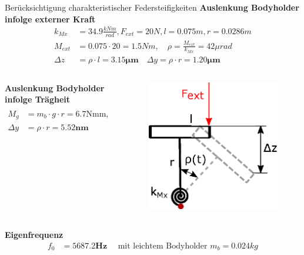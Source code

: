 \documentclass[10pt,xcolor=dvipsnames]{beamer}
\begin{document}
		\begin{frame}{\small Berücksichtigung charakteristischer Federsteifigkeiten}
                          \textbf{\color{umitblau}Auslenkung Bodyholder infolge externer Kraft} 
					\begin{align*}
					k_{Mx} &= 34.9\frac{kNm}{rad}, F_{ext}=20N, l=0.075m, r=0.0286m\\
					M_{ext} &= 0.075\cdot20 = 1.5Nm, \quad \rho = \frac{M_{ext}}{k_{Mx}} = 42\mu rad\\
					\Delta z &= \rho\cdot l=\bm{3.15\mu m}\quad \Delta y=\rho\cdot r=\bm{1.20\mu m}
					\end{align*}
                  \begin{columns}[totalwidth=\textwidth]
			\begin{column}{0.7\textwidth}
                          \textbf{\color{umitblau}Auslenkung Bodyholder infolge Trägheit} 
                                        \begin{align*}
                                          M_g &=m_b\cdot g \cdot r =6.7\text{Nmm},\quad \rho = \frac{M_{g}}{k_{Mx}} = 0.193\mu rad\\
                                          \Delta y&=\rho\cdot r=\bm{5.52 n m}
                                        \end{align*}
                                      \end{column}
			\hfill
			\begin{column}{0.28\textwidth}
				\begin{figure}
					\includegraphics[width=0.6\linewidth]{./pics/bodyHolder.eps}
				\end{figure}
			\end{column}
                      \end{columns}
                          \textbf{\color{umitblau}Eigenfrequenz} 
                          \begin{align*}                                         					f_{0} &= \bm{5687.2 Hz} \quad \text{ mit leichtem Bodyholder } m_b=0.024kg
                          \end{align*}
		\end{frame}
\end{document}
